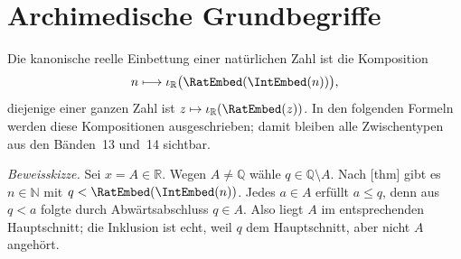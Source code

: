 \documentclass[main.tex]{subfiles}
\begin{document}

\chapter{Archimedische Grundbegriffe}

Die kanonische reelle Einbettung einer natürlichen Zahl ist die Komposition
\[
  n\longmapsto
  \RealEmb\bigl(\RatEmbed(\IntEmbed(n))\bigr),
\]
diejenige einer ganzen Zahl ist
\(z\mapsto\RealEmb(\RatEmbed(z))\). In den folgenden Formeln werden diese
Kompositionen ausgeschrieben; damit bleiben alle Zwischentypen aus den
Bänden~13 und~14 sichtbar.



\emph{Beweisskizze.}
Sei \(x=A\in\mathbb R\). Wegen \(A\neq\mathbb Q\) wähle
\(q\in\mathbb Q\setminus A\). Nach
[thm] gibt es \(n\in\mathbb N\) mit
\(q<\RatEmbed(\IntEmbed(n))\). Jedes \(a\in A\) erfüllt \(a\leq q\), denn
aus \(q<a\) folgte durch Abwärtsabschluss \(q\in A\). Also liegt \(A\) im
entsprechenden Hauptschnitt; die Inklusion ist echt, weil \(q\) dem
Hauptschnitt, aber nicht \(A\) angehört.
\end{document}
